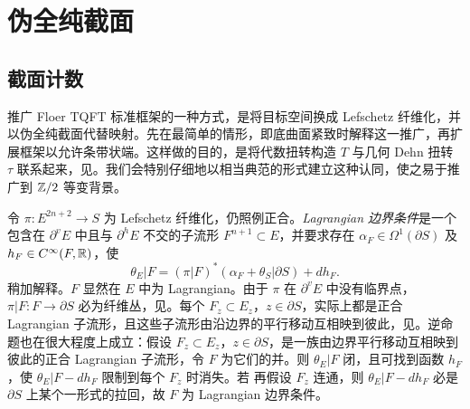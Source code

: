 \section{伪全纯截面}\label{sec:17}
\subsection{截面计数}\label{sec:17a}

推广 Floer TQFT 标准框架的一种方式，是将目标空间换成 Lefschetz 纤维化，并以伪全纯截面代替映射。先在最简单的情形，即底曲面紧致时解释这一推广，再扩展框架以允许条带状端。这样做的目的，是将代数扭转构造 $T$ 与几何 Dehn 扭转 $\tau$ 联系起来，见。我们会特别仔细地以相当典范的形式建立这种认同，使之易于推广到 $\mathbb Z/2$ 等变背景。

令 $\pi:E^{2n+2}\to S$ 为 Lefschetz 纤维化，仍照例正合。\emph{Lagrangian 边界条件}是一个包含在 $\partial^vE$ 中且与 $\partial^hE$ 不交的子流形 $F^{n+1}\subset E$，并要求存在 $\alpha_F\in\Omega^1(\partial S)$ 及 $h_F\in C^\infty(F,\mathbb R)$，使
\begin{equation}\label{eq:17.1}
\theta_E|F=(\pi|F)^*(\alpha_F+\theta_S|\partial S)+dh_F.
\end{equation}
稍加解释。$F$ 显然在 $E$ 中为 Lagrangian。由于 $\pi$ 在 $\partial^vE$ 中没有临界点，$\pi|F:F\to\partial S$ 必为纤维丛，见。每个 $F_z\subset E_z$，$z\in\partial S$，实际上都是正合 Lagrangian 子流形，且这些子流形由沿边界的平行移动互相映到彼此，见。逆命题也在很大程度上成立：假设 $F_z\subset E_z$，$z\in\partial S$，是一族由边界平行移动互相映到彼此的正合 Lagrangian 子流形，令 $F$ 为它们的并。则 $\theta_E|F$ 闭，且可找到函数 $h_F$，使 $\theta_E|F-dh_F$ 限制到每个 $F_z$ 时消失。若
再假设 $F_z$ 连通，则 $\theta_E|F-dh_F$ 必是 $\partial S$ 上某个一形式的拉回，故 $F$ 为 Lagrangian 边界条件。

